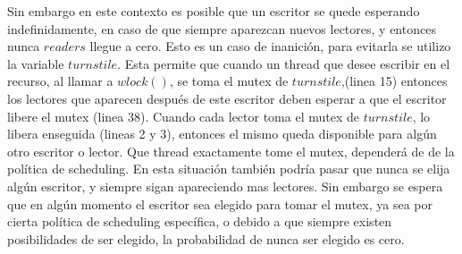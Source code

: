 Sin embargo en este contexto es posible que un escritor se quede esperando indefinidamente, en caso de que siempre aparezcan nuevos lectores, y entonces nunca $ readers $ llegue a cero. Esto es un caso de inanición, para evitarla se utilizo la variable $ turnstile $. Esta permite que cuando un thread que desee escribir en el recurso, al llamar a $ wlock() $, se toma el mutex de $ turnstile $,(linea 15) entonces los lectores que aparecen después de este escritor deben esperar a que el escritor libere el mutex (linea 38). Cuando cada lector toma el mutex de $ turnstile $, lo libera enseguida (lineas 2 y 3), entonces el mismo queda disponible para algún otro escritor o lector. Que thread exactamente tome el mutex, dependerá de de la política de scheduling. En esta situación también podría pasar que nunca se elija algún escritor, y siempre sigan apareciendo mas lectores. Sin embargo se espera que en algún momento el escritor sea elegido para tomar el mutex, ya sea por cierta política de scheduling específica, o debido a que siempre existen posibilidades de ser elegido, la probabilidad de nunca ser elegido es cero.
